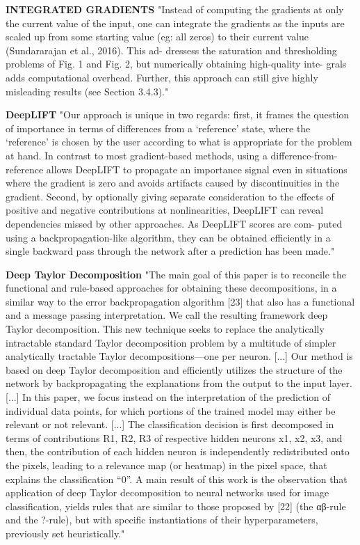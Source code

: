 		\textbf{INTEGRATED GRADIENTS}
		"Instead of computing the gradients at only the current value of the input, one can integrate the gradients as the inputs are scaled up from some starting value (eg: all zeros) to their current value (Sundararajan et al., 2016). This ad- dressess the saturation and thresholding problems of Fig. 1 and Fig. 2, but numerically obtaining high-quality inte- grals adds computational overhead. Further, this approach can still give highly misleading results (see Section 3.4.3)." \cite{Shrikumar2017}
		
		\textbf{DeepLIFT}
		"Our approach is unique in two regards: first, it frames the question of importance in terms of differences from a ‘reference’ state, where the ‘reference’ is chosen by the user according to what is appropriate for the problem at hand. In contrast to most gradient-based methods, using a difference-from-reference allows DeepLIFT to propagate an importance signal even in situations where the gradient is zero and avoids artifacts caused by discontinuities in the gradient. Second, by optionally giving separate consideration to the effects of positive and negative contributions at nonlinearities, DeepLIFT can reveal dependencies missed by other approaches. As DeepLIFT scores are com- puted using a backpropagation-like algorithm, they can be obtained efficiently in a single backward pass through the network after a prediction has been made." \cite{Shrikumar2017}
		
		\textbf{Deep Taylor Decomposition}
		"The main goal of this paper is to reconcile the functional and rule-based approaches for obtaining these decompositions, in a similar way to the error backpropagation algorithm [23] that also has a functional and a message passing interpretation. We call the resulting framework deep Taylor decomposition. This new technique seeks to replace the analytically intractable standard Taylor decomposition problem by a multitude of simpler analytically tractable Taylor decompositions—one per neuron.
		[...]
		Our method is based on deep Taylor decomposition and efficiently utilizes the structure of the network by backpropagating the explanations from the output to the input layer.
		[...]
		In this paper, we focus instead on the interpretation of the prediction of individual data points, for which portions of the trained model may either be relevant or not relevant.
		[...]
		The classification decision is first decomposed in terms of contributions R1, R2, R3 of respective hidden neurons x1, x2, x3, and then, the contribution of each hidden neuron is independently redistributed onto the pixels, leading to a relevance map (or heatmap) in the pixel space, that explains the classification “0”.
		A main result of this work is the observation that application
		of deep Taylor decomposition to neural networks used for image classification, yields rules that are similar to those proposed by [22] (the αβ-rule and the ?-rule), but with specific instantiations of their hyperparameters, previously set heuristically." \cite{Montavon2017}


